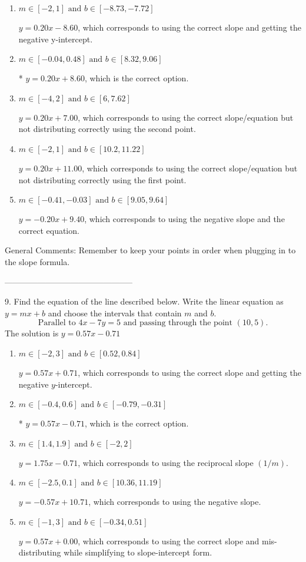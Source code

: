 \documentclass{extbook}[14pt]
\begin{document}
\begin{enumerate}[label=\Alph*.] 
\item $ m \in [-2, 1] \text{ and } b \in [-8.73, -7.72] $ 

  $y = 0.20x - 8.60$, which corresponds to using the correct slope and getting the negative y-intercept. 
\item $ m \in [-0.04, 0.48] \text{ and } b \in [8.32, 9.06] $ 

 * $y = 0.20x + 8.60$, which is the correct option. 
\item $ m \in [-4, 2] \text{ and } b \in [6, 7.62] $ 

  $y = 0.20x + 7.00$, which corresponds to using the correct slope/equation but not distributing correctly using the second point. 
\item $ m \in [-2, 1] \text{ and } b \in [10.2, 11.22] $ 

  $y = 0.20x + 11.00$, which corresponds to using the correct slope/equation but not distributing correctly using the first point. 
\item $ m \in [-0.41, -0.03] \text{ and } b \in [9.05, 9.64] $ 

  $y = -0.20x + 9.40$, which corresponds to using the negative slope and the correct equation. 
\end{enumerate} 
 
General Comments: Remember to keep your points in order when plugging in to the slope formula.

-----------------------------------------------

9. Find the equation of the line described below. Write the linear equation as $ y=mx+b $ and choose the intervals that contain $m$ and $b$.
\[ \text{Parallel to } 4 x - 7 y = 5 \text{ and passing through the point } (10, 5). \] 
The solution is $ y = 0.57x - 0.71 $ 

\begin{enumerate}[label=\Alph*.] 
\item $ m \in [-2, 3] \text{ and } b \in [0.52, 0.84] $ 

  $y = 0.57x + 0.71$, which corresponds to using the correct slope and getting the negative $y$-intercept. 
\item $ m \in [-0.4, 0.6] \text{ and } b \in [-0.79, -0.31] $ 

 * $y = 0.57x - 0.71$, which is the correct option. 
\item $ m \in [1.4, 1.9] \text{ and } b \in [-2, 2] $ 

  $y = 1.75x - 0.71$, which corresponds to using the reciprocal slope $(1/m)$. 
\item $ m \in [-2.5, 0.1] \text{ and } b \in [10.36, 11.19] $ 

  $y = -0.57x + 10.71$, which corresponds to using the negative slope. 
\item $ m \in [-1, 3] \text{ and } b \in [-0.34, 0.51] $ 

  $y = 0.57x + 0.00$, which corresponds to using the correct slope and mis-distributing while simplifying to slope-intercept form. 
\end{enumerate} 
 
\end{document}
